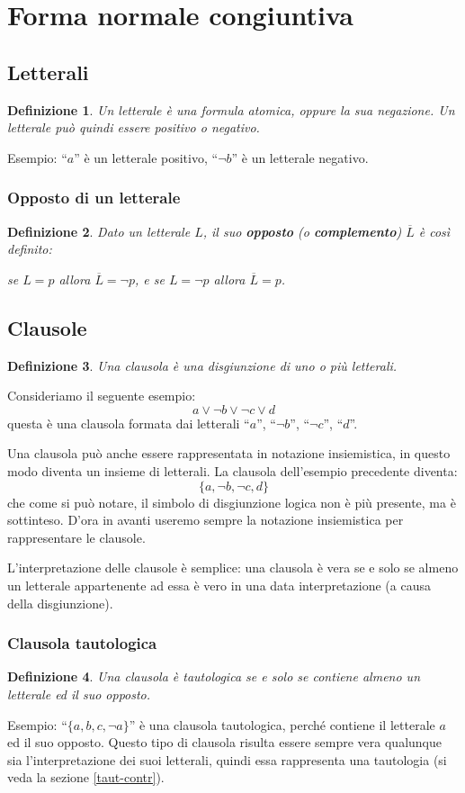 \documentclass[a4paper,12pt]{report}
\newtheorem{definition}{Definizione}[section]
\begin{document}
\section{Forma normale congiuntiva}
\label{CNF}
\subsection{Letterali}

\begin{definition}
    Un letterale è una formula atomica, oppure la sua negazione. Un letterale può quindi essere positivo o negativo.
\end{definition}
Esempio: ``$a$'' è un letterale positivo, ``$\lnot b$'' è un letterale negativo.

\subsubsection{Opposto di un letterale}
\begin{definition}
    Dato un letterale $L$, il suo \textbf{opposto} (o \textbf{complemento}) $\overline{L}$ è così definito:

    se $L = p$ allora $\overline{L} = \lnot p$, e se $L = \lnot p$ allora $\overline{L} = p$.
\end{definition}

\subsection{Clausole}
\begin{definition}
    Una clausola è una disgiunzione di uno o più letterali.
\end{definition}
Consideriamo il seguente esempio:
\[ a \lor \lnot b \lor \lnot c \lor d \] 
questa è una clausola formata dai letterali ``$a$'', ``$\lnot b$'', ``$\lnot c$'', ``$d$''.

Una clausola può anche essere rappresentata in notazione insiemistica, in questo modo diventa un insieme di letterali. La clausola dell'esempio precedente diventa:
\[ \{a, \lnot b, \lnot c, d\}\]
che come si può notare, il simbolo di disgiunzione logica non è più presente, ma è sottinteso. D'ora in avanti useremo sempre la notazione insiemistica per rappresentare le clausole.

L'interpretazione delle clausole è semplice: una clausola è vera se e solo se almeno un letterale appartenente ad essa è vero in una data interpretazione (a causa della disgiunzione).

\subsubsection{Clausola tautologica}
\begin{definition}
    Una clausola è tautologica se e solo se contiene almeno un letterale ed il suo opposto.
\end{definition}
\noindent Esempio: ``$\{ a, b, c, \lnot a \}$'' è una clausola tautologica, perché contiene il letterale $a$ ed il suo opposto. Questo tipo di clausola risulta essere sempre vera qualunque sia l'interpretazione dei suoi letterali, quindi essa rappresenta una tautologia (si veda la sezione \ref{taut-contr}).
\end{document}
